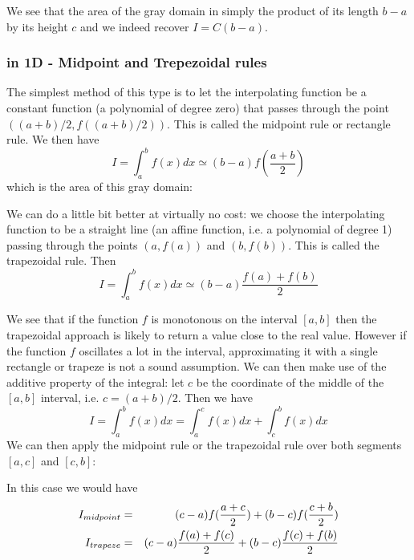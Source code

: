 

We see that the area of the gray domain in simply the product of its length $b-a$ by its height $c$
and we indeed recover $I=C(b-a)$.


\subsubsection{in 1D - Midpoint and Trepezoidal rules  \label{sec:quad1D}}

The simplest method of this type is to let the interpolating function be 
a constant function (a polynomial of degree zero) that passes through the point $((a+b)/2, f((a+b)/2))$.
This is called the midpoint rule  or rectangle rule. 
We then have 
\[
I=\int_a^b f(x)dx \simeq (b-a) f\left(\frac{a+b}{2}\right)
\]
which is the area of this gray domain:



We can do a little bit better at virtually no cost:
we choose the interpolating function to be a straight line 
(an affine function, i.e. a polynomial of degree 1)
passing through the points $(a, f(a))$ and $(b, f(b))$.
This is called the trapezoidal rule.  
Then 
\[
I=\int_a^b f(x)dx \simeq (b-a) \frac{f(a)+f(b)}{2}
\]



We see that if the function $f$ is monotonous on the interval $[a,b]$ then 
the trapezoidal approach is likely to return a value close to the real value. 
However if the function $f$ oscillates a lot in the interval, approximating it 
with a single rectangle or trapeze is not a sound assumption.
We can then make use of the additive property of the integral: let $c$ 
be the coordinate of the middle of the $[a,b]$ interval, i.e. $c=(a+b)/2$. 
Then we have 
\[
I=\int_a^b f(x)dx = \int_a^c f(x)dx + \int_c^b f(x)dx
\]
We can then apply the midpoint rule or the trapezoidal rule over both segments 
$[a,c]$ and $[c,b]$:



In this case we would have 
\begin{eqnarray}
I_{midpoint} &=& (c-a)f(\frac{a+c}{2}) + (b-c)f(\frac{c+b}{2})  \nonumber\\
I_{trapeze}  &=& (c-a)\frac{f(a)+f(c)}{2} + (b-c) \frac{f(c)+f(b)}{2} \nonumber
\end{eqnarray}

